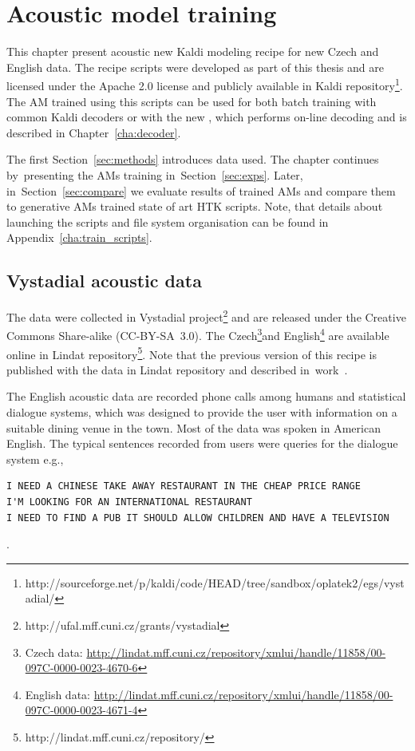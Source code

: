 \chapter{Acoustic model training}
\label{cha:train}

This chapter present acoustic new Kaldi modeling recipe for new Czech and English data.
The recipe scripts were developed as part of this thesis and are licensed under the Apache 2.0 license and publicly available in Kaldi repository\footnote{http://sourceforge.net/p/kaldi/code/HEAD/tree/sandbox/oplatek2/egs/vystadial/}.
The \ac{AM} trained using this scripts can be used for both batch training with common Kaldi decoders or with the new , which performs on-line decoding and is described in Chapter~\ref{cha:decoder}.

The first Section~\ref{sec:methods} introduces data used. 
The chapter continues by~presenting the \acp{AM} training in~Section~\ref{sec:exps}. 
Later, in~Section~\ref{sec:compare} we evaluate results of trained \acp{AM} and compare them to generative \acp{AM} trained state of art \ac{HTK} scripts.
Note, that details about launching the scripts and file system organisation can be found in Appendix~\ref{cha:train_scripts}.  

\section{Vystadial acoustic data}
\label{sec:vystadial_acoustic_data}

The data were collected in Vystadial project\footnote{http://ufal.mff.cuni.cz/grants/vystadial} and are released under the Creative Commons Share-alike (CC-BY-SA~3.0). 
The Czech\footnote{Czech data: \url{http://lindat.mff.cuni.cz/repository/xmlui/handle/11858/00-097C-0000-0023-4670-6}}and English\footnote{English data: \url{http://lindat.mff.cuni.cz/repository/xmlui/handle/11858/00-097C-0000-0023-4671-4}} are available online in Lindat repository\footnote{{http://lindat.mff.cuni.cz/repository/}}.
Note that the previous version of this recipe is published with the data in Lindat repository and described in~work~\cite{korvas_2014}.

The English acoustic data are recorded phone calls among humans and statistical dialogue systems,
which was designed to provide the user with information on a suitable dining venue in the town.
Most of the data was spoken in American English.
The typical sentences recorded from users were queries for the dialogue system e.g.,
\begin{verbatim}
I NEED A CHINESE TAKE AWAY RESTAURANT IN THE CHEAP PRICE RANGE
I'M LOOKING FOR AN INTERNATIONAL RESTAURANT
I NEED TO FIND A PUB IT SHOULD ALLOW CHILDREN AND HAVE A TELEVISION
\end{verbatim}.

